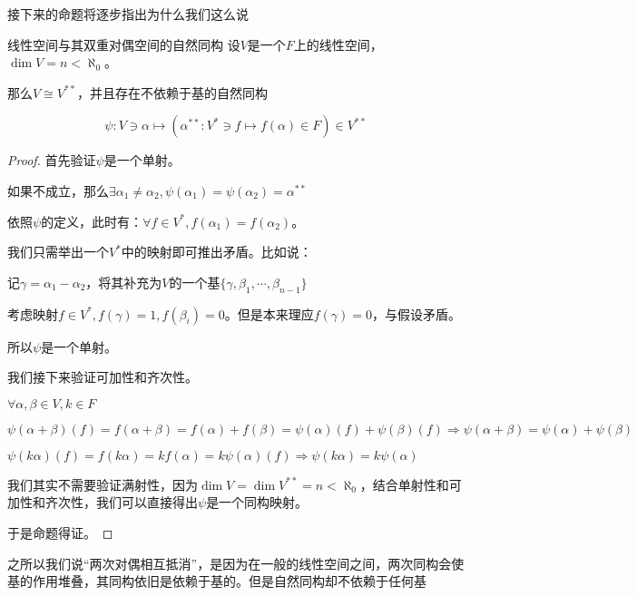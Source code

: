 \documentclass[12pt, a4paper, oneside, UTF8]{ctexbook}
\begin{document}
			接下来的命题将逐步指出为什么我们这么说
			\begin{them}{线性空间与其双重对偶空间的自然同构}{}
				设$V$是一个$F$上的线性空间，$\dim V = n < \aleph_0$。
				
				那么$V \cong V^{**}$，并且存在不依赖于基的自然同构

				\begin{equation}
					\psi : V \ni \alpha \mapsto \left(\alpha^{**}:V^* \ni f \mapsto f(\alpha ) \in F\right) \in V^{**}
				\end{equation}
			\end{them}
			\begin{proof}
				首先验证$\psi $是一个单射。

				如果不成立，那么$\exists \alpha_1 \neq \alpha_2,\psi (\alpha_1)=\psi(\alpha_2)=\alpha^{**}$

				依照$\psi $的定义，此时有：$\forall f \in V^*,f(\alpha_1)=f(\alpha_2)$。

				我们只需举出一个$V^*$中的映射即可推出矛盾。比如说：
				
				记$\gamma =\alpha_1-\alpha_2$，将其补充为$V$的一个基$\{\gamma ,\beta_1,\cdots,\beta_{n-1}\}$

				考虑映射$f\in V^*,f(\gamma )=1,f(\beta_i)=0$。但是本来理应$f(\gamma )=0$，与假设矛盾。

				所以$\psi $是一个单射。

				我们接下来验证可加性和齐次性。

				$\forall \alpha ,\beta \in V,k \in F$

				$\psi (\alpha +\beta )(f) = f(\alpha +\beta )=f(\alpha )+f(\beta )=\psi (\alpha )(f)+\psi (\beta )(f) \Rightarrow \psi (\alpha +\beta )=\psi (\alpha )+\psi (\beta )$
			
				$\psi (k\alpha )(f)=f(k\alpha )=kf(\alpha )=k\psi (\alpha )(f) \Rightarrow \psi (k\alpha )=k\psi (\alpha )$
			
				我们其实不需要验证满射性，因为$\dim V = \dim V^{**} = n < \aleph_0$，结合单射性和可加性和齐次性，我们可以直接得出$\psi $是一个同构映射。
			
				于是命题得证。
			\end{proof}
			之所以我们说“两次对偶相互抵消”，是因为在一般的线性空间之间，两次同构会使基的作用堆叠，其同构依旧是依赖于基的。但是自然同构却不依赖于任何基
\end{document}
